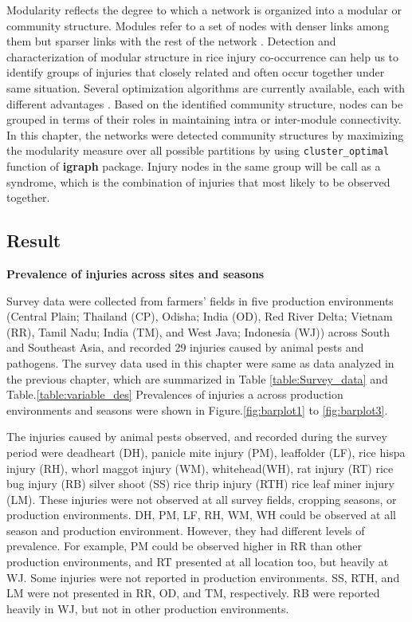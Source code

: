 Modularity reflects the degree to which a network is organized into a modular or community structure. Modules refer to a set of nodes with denser links among them but sparser links with the rest of the network \citep{Newman_2006_Modularity}. Detection and characterization of modular structure in rice injury co-occurrence can help us to identify groups of injuries that closely related and often occur together under same situation. Several optimization algorithms are currently available, each with different advantages \citep{Brandes_2008_Modularity}. Based on the identified community structure, nodes can be grouped in terms of their roles in maintaining intra or inter-module connectivity. In this chapter, the networks were detected community structures by maximizing the modularity measure over all possible partitions by using \texttt{cluster\_optimal} function of \textbf{igraph} package. Injury nodes in the same group will be call as a syndrome, which is the combination of injuries that most likely to be observed together. 


\newpage
\subsection{Result}

\textbf{Prevalence of injuries across sites and seasons}

Survey data were collected from farmers’ fields in five production environments (Central Plain; Thailand (CP), Odisha; India (OD), Red River Delta; Vietnam (RR), Tamil Nadu; India (TM), and West Java; Indonesia (WJ)) across South and Southeast Asia, and recorded 29 injuries caused by animal pests and pathogens.  The survey data used in this chapter were same as data analyzed in the previous chapter, which are summarized in Table \ref{table:Survey_data} and Table.\ref{table:variable_des} Prevalences of injuries a across production environments and seasons were shown in Figure.\ref{fig:barplot1} to \ref{fig:barplot3}. 

The injuries caused by animal pests observed, and recorded during the survey period were deadheart (DH), panicle mite injury (PM), leaffolder (LF), rice hispa injury (RH), whorl maggot injury (WM), whitehead(WH), rat injury (RT) rice bug injury (RB) silver shoot (SS) rice thrip injury (RTH) rice leaf miner injury (LM). These injuries were not observed at all survey fields, cropping seasons, or production environments.  DH, PM, LF, RH, WM, WH could be observed at all season and production environment. However, they had different levels of prevalence. For example, PM could be observed higher in RR than other production environments, and RT presented at all location too, but heavily at WJ. Some injuries were not reported in production environments. SS, RTH, and LM were not presented in RR, OD, and TM, respectively. RB were reported heavily in WJ, but not in other production environments.  
 
